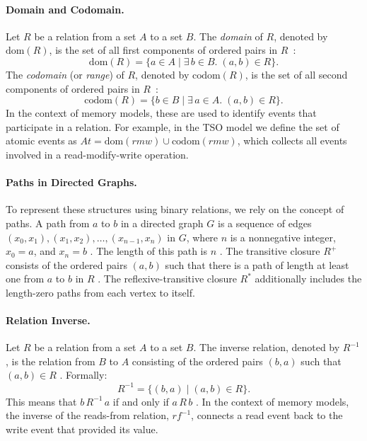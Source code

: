 \paragraph{Domain and Codomain.}
Let $R$ be a relation from a set $A$ to a set $B$.
The \emph{domain} of $R$, denoted by $\mathrm{dom}(R)$, is the set of all first components of ordered pairs in $R$~\citep[p.~607]{rosen2012discrete}:
\[
  \mathrm{dom}(R) = \{ a \in A \mid \exists\, b \in B.\; (a, b) \in R \}.
\]
The \emph{codomain} (or \emph{range}) of $R$, denoted by $\mathrm{codom}(R)$, is the set of all second components of ordered pairs in $R$~\citep[p.~607]{rosen2012discrete}:
\[
  \mathrm{codom}(R) = \{ b \in B \mid \exists\, a \in A.\; (a, b) \in R \}.
\]
In the context of memory models, these are used to identify events that participate in a relation.
For example, in the TSO model we define the set of atomic events as $\mathit{At} = \mathrm{dom}(\mathit{rmw}) \cup \mathrm{codom}(\mathit{rmw})$, which collects all events involved in a read-modify-write operation.

\paragraph{Paths in Directed Graphs.}
To represent these structures using binary relations, we rely on the concept of paths. A path from $a$ to $b$ in a directed graph $G$ is a sequence of edges $(x_0, x_1), (x_1, x_2), \dots, (x_{n-1}, x_n)$ in $G$, where $n$ is a nonnegative integer, $x_0 = a$, and $x_n = b$ \citep[p.~629]{rosen2012discrete}. The length of this path is $n$ \citep[p.~629]{rosen2012discrete}. The transitive closure $R^+$ consists of the ordered pairs $(a, b)$ such that there is a path of length at least one from $a$ to $b$ in $R$ \citep[p.~631]{rosen2012discrete}. The reflexive-transitive closure $R^*$ additionally includes the length-zero paths from each vertex to itself.

\paragraph{Relation Inverse.}
Let $R$ be a relation from a set $A$ to a set $B$. The inverse relation, denoted by $R^{-1}$, is the relation from $B$ to $A$ consisting of the ordered pairs $(b, a)$ such that $(a, b) \in R$ \citep[p.~665]{rosen2012discrete}. Formally:
\[
R^{-1} = \{(b, a) \mid (a, b) \in R\}.
\]
This means that $b \, R^{-1} \, a$ if and only if $a \, R \, b$ \citep[p.~665]{rosen2012discrete}. In the context of memory models, the inverse of the reads-from relation, $\mathit{rf}^{-1}$, connects a read event back to the write event that provided its value.


